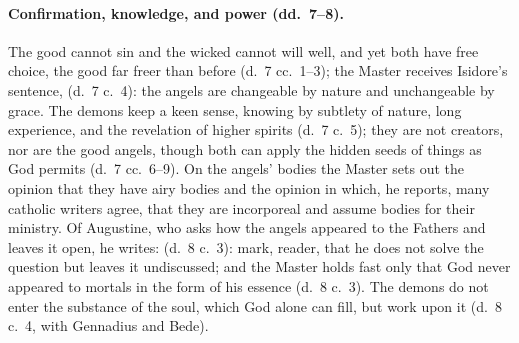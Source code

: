 \paragraph{Confirmation, knowledge, and power (dd.~7--8).} The good cannot
sin and the wicked cannot will well, and yet both have free choice, the good
far freer than before (d.~7 cc.~1--3); the Master receives Isidore's
sentence,  (d.~7
c.~4): the angels are changeable by nature and unchangeable by grace. The
demons keep a keen sense, knowing by subtlety of nature, long experience,
and the revelation of higher spirits (d.~7 c.~5); they are not creators,
nor are the good angels, though both can apply the hidden seeds of things
as God permits (d.~7 cc.~6--9). On the angels' bodies the Master sets out
the opinion that they have airy bodies and the opinion in which, he reports, many
catholic writers agree, that they are incorporeal and assume bodies for their ministry.
Of Augustine, who asks how the angels appeared to the Fathers and leaves it
open, he writes:  (d.~8 c.~3): mark, reader, that he does
not solve the question but leaves it undiscussed; and the Master holds
fast only that God never appeared to mortals in the form of his essence
(d.~8 c.~3). The demons do not enter the substance of the soul, which God
alone can fill, but work upon it (d.~8 c.~4, with Gennadius and Bede).

